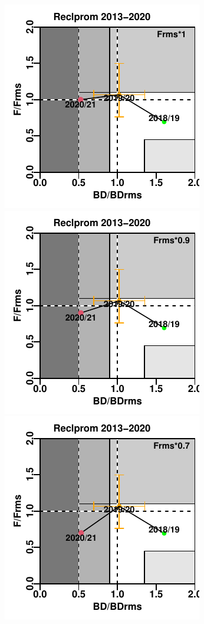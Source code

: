 \documentclass[
  spanish,
]{article}
\begin{document}
\includegraphics{FigurasInforme_Marzo/Fig44c_sept-1.pdf}
\includegraphics{FigurasInforme_Marzo/Fig44c_sept-2.pdf}
\includegraphics{FigurasInforme_Marzo/Fig44c_sept-3.pdf}
\end{document}
